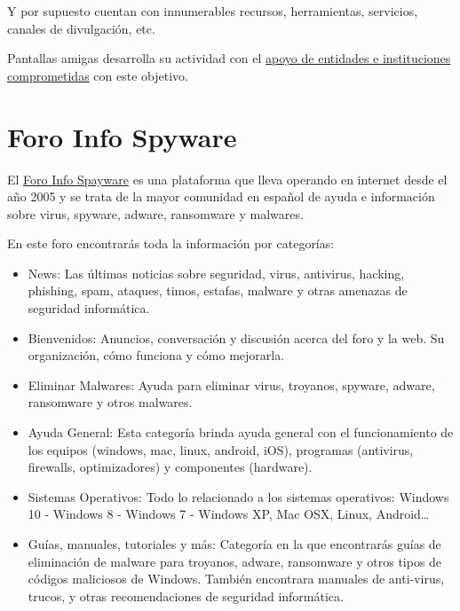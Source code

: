 \documentclass[
  spanish,
  a4paper,
  openany]{book}
\begin{document}
Y por supuesto cuentan con innumerables recursos, herramientas, servicios, canales de divulgación, etc.

Pantallas amigas desarrolla su actividad con el \href{https://www.pantallasamigas.net/confian-en-pantallasamigas/}{apoyo de entidades e instituciones comprometidas} con este objetivo.

\hypertarget{foro-info-spyware}{%
\section{Foro Info Spyware}\label{foro-info-spyware}}

El \href{https://forospyware.com/}{Foro Info Spayware} es una plataforma que lleva operando en internet desde el año 2005 y se trata de la mayor comunidad en español de ayuda e información sobre virus, spyware, adware, ransomware y malwares.

En este foro encontrarás toda la información por categorías:

\begin{itemize}
\item
  News: Las últimas noticias sobre seguridad, virus, antivirus, hacking, phishing, spam, ataques, timos, estafas, malware y otras amenazas de seguridad informática.
\item
  Bienvenidos: Anuncios, conversación y discusión acerca del foro y la web. Su organización, cómo funciona y cómo mejorarla.
\item
  Eliminar Malwares: Ayuda para eliminar virus, troyanos, spyware, adware, ransomware y otros malwares.
\item
  Ayuda General: Esta categoría brinda ayuda general con el funcionamiento de los equipos (windows, mac, linux, android, iOS), programas (antivirus, firewalls, optimizadores) y componentes (hardware).
\item
  Sistemas Operativos: Todo lo relacionado a los sistemas operativos: Windows 10 - Windows 8 - Windows 7 - Windows XP, Mac OSX, Linux, Android\ldots{}
\item
  Guías, manuales, tutoriales y más: Categoría en la que encontrarás guías de eliminación de malware para troyanos, adware, ransomware y otros tipos de códigos maliciosos de Windows. También encontrara manuales de anti-virus, trucos, y otras recomendaciones de seguridad informática.
\end{itemize}

  
\end{document}
